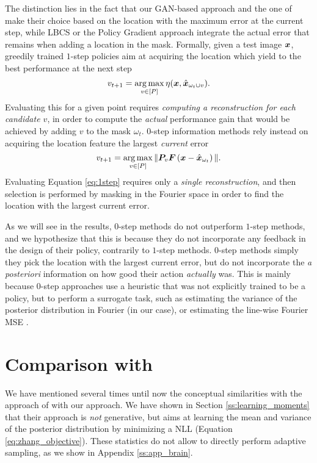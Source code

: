 The distinction lies in the fact that our GAN-based approach and the one of \citet{zhang2019reducing} make their choice based on the location with the maximum error at the current step, while LBCS or the Policy Gradient approach \citep{bakker2020experimental} integrate the actual error that remains when adding a location in the mask. Formally, given a test image ${\bm{x}}$, greedily trained $1$-step policies aim at acquiring the location which yield to the best performance at the next step
\begin{equation}
    v_{t+1} = \operatorname*{arg\,max}_{v\in[P]} \eta({\bm{x}},\hat{{\bm{x}}}_{\omega_{t}\cup v}).\label{eq:1step}
\end{equation}
Evaluating this for a given point requires \textit{computing a reconstruction for each candidate $v$}, in order to compute the \textit{actual} performance gain that would be achieved by adding $v$ to the mask $\omega_t$. $0$-step information methods rely instead on acquiring the location feature the largest \textit{current} error
\begin{equation}
    v_{t+1} = \operatorname*{arg\,max}_{v\in[P]} \| {\bm{P}}_v {\bm{F}}\left({\bm{x}}- \hat{{\bm{x}}}_{\omega_t}\right) \|.\label{eq:0step}
\end{equation}
Evaluating Equation \ref{eq:1step} requires only a \textit{single reconstruction}, and then selection is performed by masking in the Fourier space in order to find the location with the largest current error. 

As we will see in the results, $0$-step methods do not outperform $1$-step methods, and we hypothesize that this is because they do not incorporate any feedback in the design of their policy, contrarily to $1$-step methods. $0$-step methods simply they pick the location with the largest current error, but do not incorporate the \textit{a posteriori} information on how good their action \textit{actually} was. This is mainly because $0$-step approaches use a heuristic that was not explicitly trained to be a policy, but to perform a surrogate task, such as estimating the variance of the posterior distribution in Fourier (in our case), or estimating the line-wise Fourier MSE \citep{zhang2019reducing}.

\section{Comparison with \citet{zhang2019reducing}}\label{ss:gan_zhang}
We have mentioned several times until now the conceptual similarities with the approach of \citet{zhang2019reducing} with our approach. We have shown in Section \ref{ss:learning_moments} that their approach is \textit{not} generative, but aims at learning the mean and variance of the posterior distribution by minimizing a NLL (Equation \ref{eq:zhang_objective}). These statistics do not allow to directly perform adaptive sampling, as we show in Appendix \ref{ss:app_brain}. 

